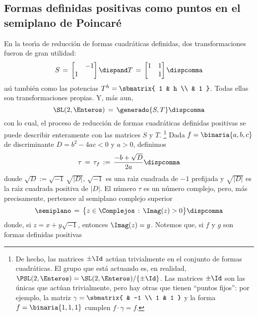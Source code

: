 \subsection{Formas definidas positivas como puntos en el semiplano de Poincar\'e}
En la teor\'{\i}a de reducci\'on de formas cuadr\'aticas definidas,
dos transformaciones fueron de gran utilidad:
\begin{displaymath}
	S\,=\,\begin{bmatrix} & -1 \\ 1 & \end{bmatrix}\dispand
	T\,=\,\begin{bmatrix} 1 & 1 \\ & 1 \end{bmatrix}
		\dispcomma
\end{displaymath}
%
as\'{\i} tambi\'en como las potencias $T^h=\sbmatrix{ 1 & h \\ & 1 }$.
Todas ellas son transformaciones propias. Y, m\'as aun,
\begin{displaymath}
	\SL(2,\Enteros)\,=\,\generado{S,T}
	\dispcomma
\end{displaymath}
%
con lo cual, el proceso de reducci\'on de formas cuadr\'aticas definidas
positivas se puede describir enteramente con las matrices $S$ y $T$.%
\footnote{
	De hecho, las matrices $\pm\Id$ act\'uan trivialmente en el conjunto
	de formas cuadr\'aticas. El grupo que est\'a actuando es, en realidad,
	$\PSL(2,\Enteros)=\SL(2,\Enteros)/\{\pm\Id\}$.
	Las matrices $\pm\Id$ son las \'unicas que act\'uan trivialmente,
	pero hay otras que tienen ``puntos fijos'': por ejemplo,
	la matriz $\gamma=\sbmatrix{ & -1 \\ 1 & 1 }$ y la forma
	$f=\binaria{1,1,1}$ cumplen $f\cdot\gamma=f$.
}
Dada $f=\binaria{a,b,c}$ de discriminante $D=b^2-4ac<0$ y $a>0$, definimos
\begin{displaymath}
	\tau\,=\,\tau_f\,:=\,\frac{-b+\sqrt D}{2a}
	\dispcomma
\end{displaymath}
%
donde $\sqrt{D}:=\sqrt{-1}\,\sqrt{|D|}$, $\sqrt{-1}$ es una ra\'{\i}z
cuadrada de $-1$ prefijada y $\sqrt{|D|}$ es la ra\'{\i}z cuadrada positiva
de $|D|$.
El n\'umero $\tau$ es un n\'umero complejo, pero, m\'as precisamente,
pertenece al semiplano complejo superior
\begin{displaymath}
	\semiplano\,=\,\big\{z\in\Complejos\,:\,\Imag(z)>0\big\}
	\dispcomma
\end{displaymath}
%
donde, si $z=x+y\sqrt{-1}$, entonces $\Imag(z)=y$.
Notemos que, si $f$ y $g$ son formas definidas positivas

